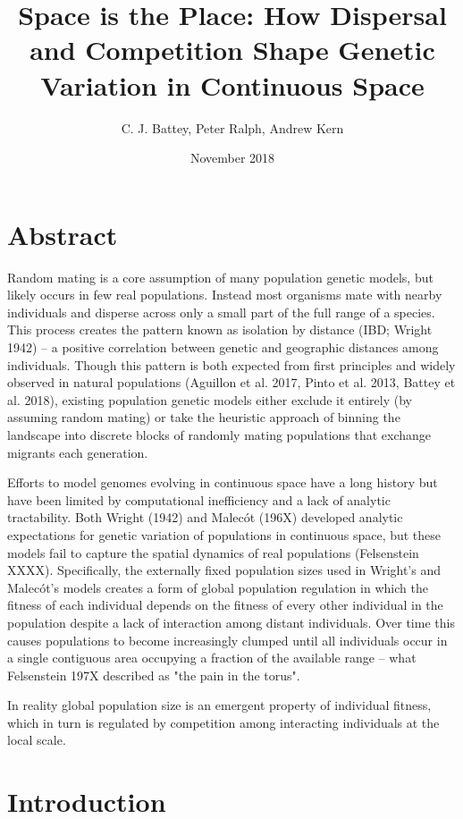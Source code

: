 \documentclass[12pt]{amsart}
\title{ Space is the Place: How Dispersal and Competition Shape Genetic Variation in Continuous Space }
\author{C. J. Battey, Peter Ralph, Andrew Kern}
\date{November 2018} %
\begin{document}
\maketitle
\tableofcontents

\section{Abstract}
Random mating is a core assumption of many population genetic models, but likely occurs in few real populations. Instead most organisms mate with nearby individuals and disperse across only a small part of the full range of a species. This process creates the pattern known as isolation by distance (IBD; Wright 1942) -- a positive correlation between genetic and geographic distances among individuals. Though this pattern is both expected from first principles and widely observed in natural populations (Aguillon et al. 2017, Pinto et al. 2013, Battey et al. 2018), existing population genetic models either exclude it entirely (by assuming random mating) or take the heuristic approach of binning the landscape into discrete blocks of randomly mating populations that exchange migrants each generation. 

Efforts to model genomes evolving in continuous space have a long history but have been limited by computational inefficiency and a lack of analytic tractability. Both Wright (1942) and Malecót (196X) developed analytic expectations for genetic variation of populations in continuous space, but these models fail to capture the spatial dynamics of real populations (Felsenstein XXXX). Specifically, the externally fixed population sizes used in Wright's and Malecót's models creates a form of global population regulation in which the fitness of each individual depends on the fitness of every other individual in the population despite a lack of interaction among distant individuals. Over time this causes populations to become increasingly clumped until all individuals occur in a single contiguous area occupying a fraction of the available range -- what Felsenstein 197X described as "the pain in the torus". 

In reality global population size is an emergent property of individual fitness, which in turn is regulated by competition among interacting individuals at the local scale. 

\section{Introduction}
\end{document}
